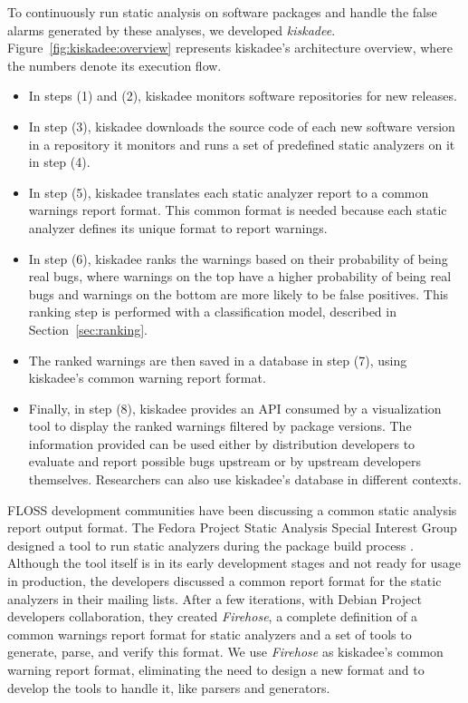 To continuously run static analysis on software packages and handle the false
alarms generated by these analyses, we developed \textit{kiskadee}.
Figure~\ref{fig:kiskadee:overview} represents kiskadee's architecture overview,
where the numbers denote its execution flow.
\begin{itemize}
  \item In steps (1) and (2), kiskadee
monitors software repositories for new releases.
    \item In step (3), kiskadee
downloads the source code of each new software version in a repository it
monitors and runs a set of predefined static analyzers on it in step (4).
    \item In step (5),
kiskadee translates each static analyzer report to a common warnings report format.
This common format is needed because each static analyzer defines
its unique format to report warnings.
    \item In step (6), kiskadee ranks the warnings
based on their probability of being real bugs, where warnings on the top have a
higher probability of being real bugs and warnings on the bottom are more
likely to be false positives. This ranking step is performed with a
classification model, described in Section~\ref{sec:ranking}.
    \item The ranked
warnings are then saved in a database in step (7), using kiskadee's common
warning report format.  
    \item Finally, in step (8), kiskadee provides an API consumed
by a visualization tool to display the ranked warnings filtered by package
versions. The information provided can be used either by distribution developers to
evaluate and report possible bugs upstream or by upstream developers
themselves. Researchers can also use kiskadee's database in different contexts.
\end{itemize}

FLOSS development communities have been discussing a common static analysis
report output format. The Fedora Project Static Analysis Special Interest Group
\cite{fedora:static:sig} designed a tool to run static analyzers during the
package build process \cite{fedora:mockwithanalysis}.  Although the tool itself
is in its early development stages and not ready for usage in production, the
developers discussed \cite{fedora:mlist} a common report format for the static
analyzers in their mailing lists. After a few iterations, with Debian Project
developers collaboration, they created \textit{Firehose}, a complete definition
of a common warnings report format for static analyzers and a set of tools to
generate, parse, and verify this format.  We use \textit{Firehose} as kiskadee's
common warning report format, eliminating the need to design a new format and
to develop the tools to handle it, like parsers and generators.

